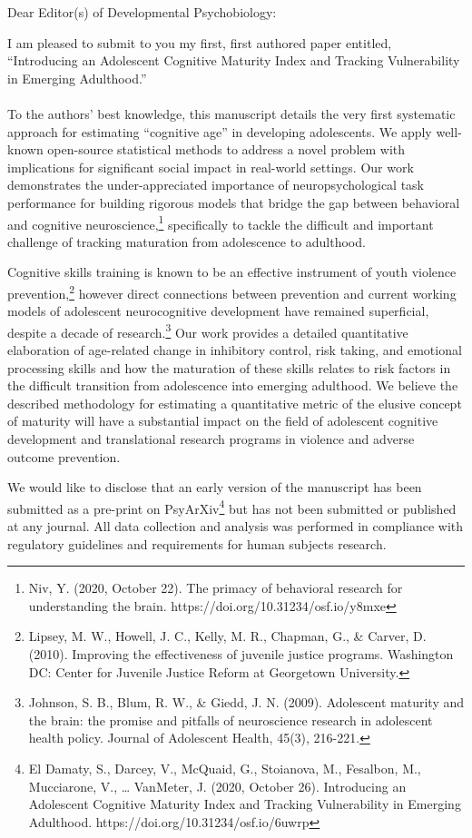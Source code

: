 \documentclass{letter}
\begin{document}
\begin{letter}{}
\opening{Dear Editor(s) of Developmental Psychobiology:}
I am pleased to submit to you my first, first authored paper entitled, ``Introducing an Adolescent Cognitive Maturity Index and Tracking Vulnerability in Emerging Adulthood.'' 
\\ \\
To the authors' best knowledge, this manuscript details the very first systematic approach for estimating ``cognitive age'' in developing adolescents. We apply well-known open-source statistical methods to address a novel problem with implications for significant social impact in real-world settings. Our work demonstrates the under-appreciated importance of neuropsychological task performance for building rigorous models that bridge the gap between behavioral and cognitive neuroscience,\footnote[1]{Niv, Y. (2020, October 22). The primacy of behavioral research for understanding the brain. https://doi.org/10.31234/osf.io/y8mxe} specifically to tackle the difficult and important challenge of tracking maturation from adolescence to adulthood. 

Cognitive skills training is known to be an effective instrument of youth violence prevention,\footnote[2]{Lipsey, M. W., Howell, J. C., Kelly, M. R., Chapman, G., \& Carver, D. (2010). Improving the effectiveness of juvenile justice programs. Washington DC: Center for Juvenile Justice Reform at Georgetown University.} however direct connections between prevention and current working models of adolescent neurocognitive development have remained superficial, despite a decade of research.\footnote[3]{Johnson, S. B., Blum, R. W., \& Giedd, J. N. (2009). Adolescent maturity and the brain: the promise and pitfalls of neuroscience research in adolescent health policy. Journal of Adolescent Health, 45(3), 216-221.} Our work provides a detailed quantitative elaboration of age-related change in inhibitory control, risk taking, and emotional processing skills and how the maturation of these skills relates to risk factors in the difficult transition from adolescence into emerging adulthood. We believe the described methodology for estimating a quantitative metric of the elusive concept of maturity will have a substantial impact on the field of adolescent cognitive development and translational research programs in violence and adverse outcome prevention. 

We would like to disclose that an early version of the manuscript has been submitted as a pre-print on PsyArXiv\footnote[4]{El Damaty, S., Darcey, V., McQuaid, G., Stoianova, M., Fesalbon, M., Mucciarone, V., … VanMeter, J. (2020, October 26). Introducing an Adolescent Cognitive Maturity Index and Tracking Vulnerability in Emerging Adulthood. https://doi.org/10.31234/osf.io/6uwrp} but has not been submitted or published at any journal. All data collection and analysis was performed in compliance with regulatory guidelines and requirements for human subjects research.


\end{letter}
\end{document}
